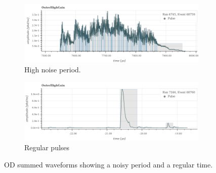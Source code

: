 \begin{figure}[!htbp]
\begin{subfigure}{\textwidth}
  \centering
  \includegraphics[width=\linewidth]{Figures/OD_Backgrounds/noise_pulse.png}
  \caption{High noise period.}
  \label{fig:noise_od_waveform}
  \end{subfigure}
  \begin{subfigure}{\textwidth}
  \centering
  \includegraphics[width=\linewidth]{Figures/OD_Backgrounds/regular_pulse.png}
  \caption{Regular pulses}
  \label{fig:regular_od_waveform}
  \end{subfigure}
\caption{OD summed waveforms showing a noisy period and a regular time.}
\label{fig:od_noise_cut_waveforms}
\end{figure}